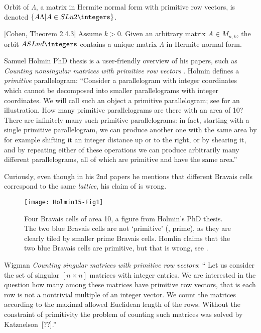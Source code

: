 \begin{description}
\renewcommand\speriod[1]{{\ensuremath{\ell_{#1}}}}  %
\renewcommand\period[1]{{\ensuremath{\ell_{#1}}}}  %

Orbit of $\Lambda$, a matrix in
Hermite normal form with primitive row vectors,
is denoted $\{A\Lambda|A\in{SL}n{2}{\integers}\}$.

[Cohen, Theorem 2.4.3]
Assume $k>0$. Given an arbitrary matrix $A\in M_{n,k}$, the orbit
$A{SL}n{d}{\integers}$ contains a unique matrix  $\Lambda$ in Hermite normal form.


{Samuel Holmin} PhD thesis is a user-friendly overview of
his papers, such as {\em Counting nonsingular matrices with primitive row
vectors} .
Holmin defines a \emph{primitive} parallelogram: ``Consider a
parallelogram with integer coordinates which cannot be decom\-posed into
smaller parallelograms with integer coordinates. We will call such an
object a primitive parallelogram; see  for an
illustration. How many primitive parallelograms are there with an area of
10? There are infinitely many such primitive parallelograms: in fact,
starting with a single primitive parallelogram, we can produce another
one with the same area by for example shifting it an integer distance up
or to the right, or by shearing it, %
and by repeating
either of these operations we can produce arbitrarily many different
parallelograms, all of which are primitive and have the same area.''

Curiously, even though in his 2nd papers he mentions that different
Bravais cells correspond to the same {\em lattice}, his
claim of  is wrong.

\begin{figure}
  \centering
  \texttt{[image: Holmin15-Fig1]}
  \caption{
Four Bravais cells of area 10, a figure from Holmin's PhD thesis.
The two blue Bravais cells are not
`primitive' (\ie, prime), as they are clearly
tiled by smaller prime Bravais cells.
Homlin claims that the two blue Bravais cells are
primitive, but that is wrong, see .
          }\label{Holmin15-Fig1}
\end{figure}

Wigman
{\em Counting singular matrices with primitive row vectors}: ``
Let us consider the set of singular $[n\times{n}]$ matrices with integer
entries. We are interested in the question how many among these matrices
have primitive row vectors, that is each row is not a nontrivial multiple
of an integer vector. We count the matrices according to the maximal
allowed Euclidean length of  the  rows.  Without  the  constraint  of
primitivity  the  problem  of  counting  such matrices  was  solved  by
Katznelson~[??].''


\end{description}

